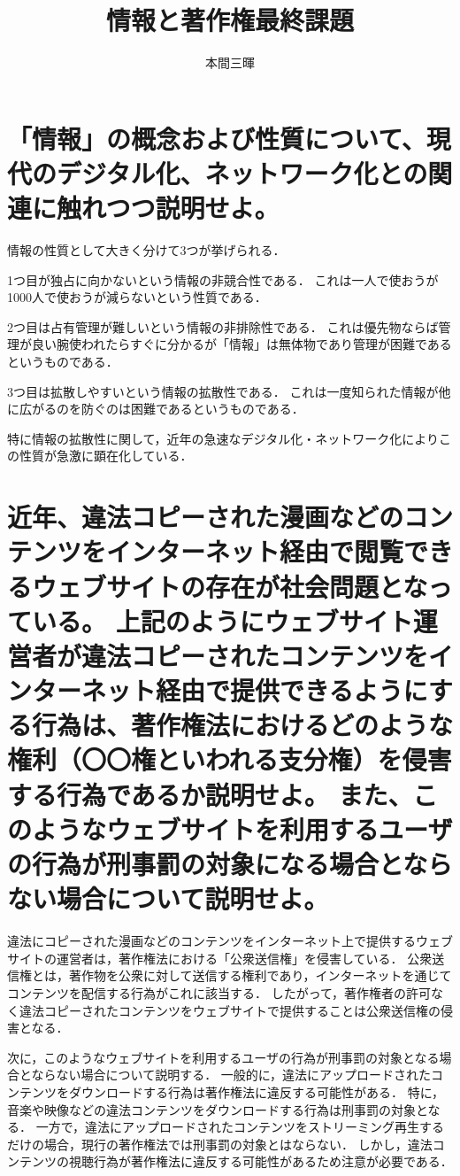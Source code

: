 \documentclass[titlepage,a4paper]{jsarticle}
\title{情報と著作権最終課題}
\author{本間三暉}
\begin{document}
\maketitle
\section{「情報」の概念および性質について、現代のデジタル化、ネットワーク化との関連に触れつつ説明せよ。}
情報の性質として大きく分けて3つが挙げられる．

1つ目が独占に向かないという情報の非競合性である．
これは一人で使おうが1000人で使おうが減らないという性質である．

2つ目は占有管理が難しいという情報の非排除性である．
これは優先物ならば管理が良い腕使われたらすぐに分かるが「情報」は無体物であり管理が困難であるというものである．

3つ目は拡散しやすいという情報の拡散性である．
これは一度知られた情報が他に広がるのを防ぐのは困難であるというものである．

特に情報の拡散性に関して，近年の急速なデジタル化・ネットワーク化によりこの性質が急激に顕在化している．

\section{近年、違法コピーされた漫画などのコンテンツをインターネット経由で閲覧できるウェブサイトの存在が社会問題となっている。
  上記のようにウェブサイト運営者が違法コピーされたコンテンツをインターネット経由で提供できるようにする行為は、著作権法におけるどのような権利（〇〇権といわれる支分権）を侵害する行為であるか説明せよ。
  また、このようなウェブサイトを利用するユーザの行為が刑事罰の対象になる場合とならない場合について説明せよ。}
違法にコピーされた漫画などのコンテンツをインターネット上で提供するウェブサイトの運営者は，著作権法における「公衆送信権」を侵害している．
公衆送信権とは，著作物を公衆に対して送信する権利であり，インターネットを通じてコンテンツを配信する行為がこれに該当する．
したがって，著作権者の許可なく違法コピーされたコンテンツをウェブサイトで提供することは公衆送信権の侵害となる．

次に，このようなウェブサイトを利用するユーザの行為が刑事罰の対象となる場合とならない場合について説明する．
一般的に，違法にアップロードされたコンテンツをダウンロードする行為は著作権法に違反する可能性がある．
特に，音楽や映像などの違法コンテンツをダウンロードする行為は刑事罰の対象となる．
一方で，違法にアップロードされたコンテンツをストリーミング再生するだけの場合，現行の著作権法では刑事罰の対象とはならない．
しかし，違法コンテンツの視聴行為が著作権法に違反する可能性があるため注意が必要である．\cite{task2}
\end{document}
